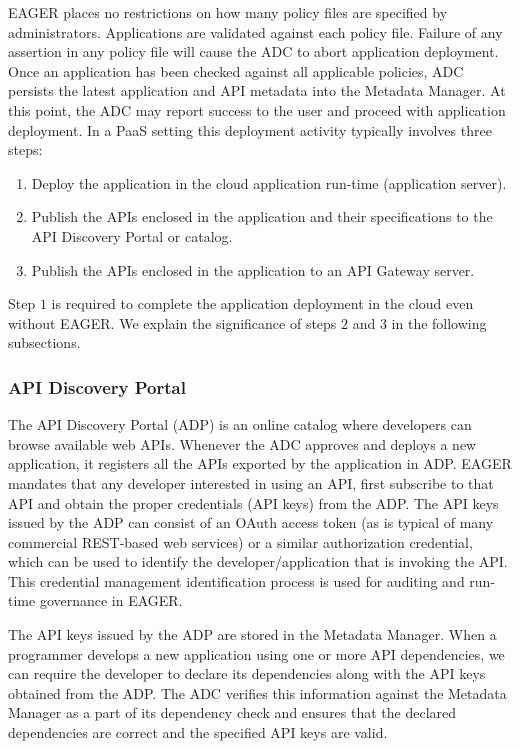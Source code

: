 EAGER places no restrictions on how many policy files are specified by 
administrators. Applications are validated against each policy file. Failure
of any assertion in any policy file will cause the ADC to abort 
application deployment. Once an application has been checked against all
applicable policies, ADC persists the latest application and API metadata into
the Metadata Manager.  At this point, the ADC may report success to the user
and proceed with application deployment. In a PaaS setting
this deployment activity typically involves three steps:

\begin{enumerate}
\vspace{0.05in}
\item Deploy the application in the cloud application run-time (application server).
\vspace{0.05in}
\item Publish the APIs enclosed in the application and their specifications to
the API Discovery Portal or catalog.
\vspace{0.05in}
\item Publish the APIs enclosed in the application to an API Gateway server.
\vspace{0.05in}
\end{enumerate}

Step $1$ is required to complete the application deployment in the cloud even
without EAGER. We explain the significance of steps $2$ and $3$ in the 
following subsections.

\subsubsection{API Discovery Portal} 
The API Discovery Portal (ADP) is an online
catalog where developers can browse available web APIs. Whenever the ADC
approves and deploys a new application, it registers all the APIs exported by
the application in ADP.  EAGER mandates that any developer interested in using
an API, first subscribe to that API and obtain the proper credentials (API
keys) from the ADP. The API keys issued by the ADP can consist of an
OAuth%
access
token (as is typical of many commercial REST-based web services) 
or a similar authorization credential, which can be used to identify the
developer/application that is invoking the API. This credential management
identification process is used for auditing and run-time governance in EAGER.

The API keys issued by the ADP are stored in the Metadata Manager. When a
programmer develops a new application using one or more API dependencies, we
can require the developer to declare its dependencies along with the API
keys obtained from the ADP. The ADC verifies this information against
the Metadata Manager as a part of its dependency check and ensures that the
declared dependencies are correct and the specified API keys are valid. 

